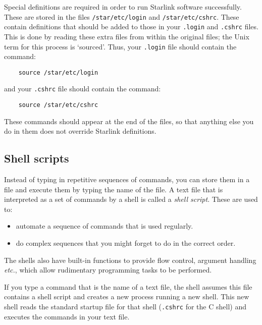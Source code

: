 \documentclass[twoside,11pt]{article}
\begin{document}
Special definitions are required in order to run Starlink software successfully.
These are stored in the files {\tt /star/etc/login} and {\tt /star/etc/cshrc}.
These contain definitions that should be added to those in your {\tt .login} and
{\tt .cshrc} files.
This is done by reading these extra files from within the original files; the
Unix term for this process is `sourced'.
Thus, your {\tt .login} file should contain the command:
\begin{verbatim}
    source /star/etc/login
\end{verbatim}
and your {\tt .cshrc} file should contain the command:
\begin{verbatim}
    source /star/etc/cshrc
\end{verbatim}
These commands should appear at the end of the files, so that anything else
you do in them does not override Starlink definitions.

\subsection{Shell scripts\label{ss2}}

Instead of typing in repetitive sequences of commands, you can store them
in a file and execute them by typing the name of the file.
A text file that is interpreted as a set of commands by a shell is called a
{\em shell script}.
These are used to:
\begin{itemize}
\item automate a sequence of commands that is used regularly.
\item do complex sequences that you might forget to do in the correct order.
\end{itemize}
The shells also have built-in functions to provide flow control, argument
handling {\em etc.}, which allow rudimentary programming tasks to be performed.

If you type a command that is the name of a text file, the shell assumes this
file contains a shell script and creates a new process running a new shell.
This new shell reads the standard startup file for that shell ({\tt .cshrc}
for the C shell) and executes the commands in your text file.
\end{document}
